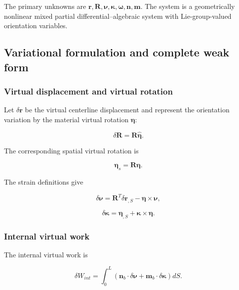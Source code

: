 The primary unknowns are \(\mathbf{r},\mathbf{R},\bm{\nu},\bm{\kappa},\bm{\omega},\mathbf{n},\mathbf{m}\). The system is a geometrically nonlinear mixed partial differential--algebraic system with Lie-group-valued orientation variables.

\subsection{Variational formulation and complete weak form}\label{sec:rod-1-5}

\subsubsection{Virtual displacement and virtual rotation}\label{sec:rod-1-5-1}

Let \(\delta\mathbf{r}\) be the virtual centerline displacement and represent the orientation variation by the material virtual rotation \(\bm{\eta}\):

\begin{equation}
\label{eq:rod-1-76}
\delta\mathbf{R} = \mathbf{R}\widehat{\bm{\eta}}.
\end{equation}

The corresponding spatial virtual rotation is

\begin{equation}
\label{eq:rod-1-77}
\bm{\eta}_{s} = \mathbf{R}\bm{\eta}.
\end{equation}

The strain definitions give

\begin{equation}
\label{eq:rod-1-78}
\delta\bm{\nu} = \mathbf{R}^{T}\delta\mathbf{r}_{,S} - \bm{\eta} \times \bm{\nu},
\end{equation}

\begin{equation}
\label{eq:rod-1-79}
\delta\bm{\kappa} = \bm{\eta}_{,S} + \bm{\kappa} \times \bm{\eta}.
\end{equation}

\subsubsection{Internal virtual work}\label{sec:rod-1-5-2}

The internal virtual work is

\begin{equation}
\label{eq:rod-1-80}
\delta W_{int} = \int_{0}^{L}\left( \mathbf{n}_{b} \cdot \delta\bm{\nu} + \mathbf{m}_{b} \cdot \delta\bm{\kappa} \right)dS.
\end{equation}

